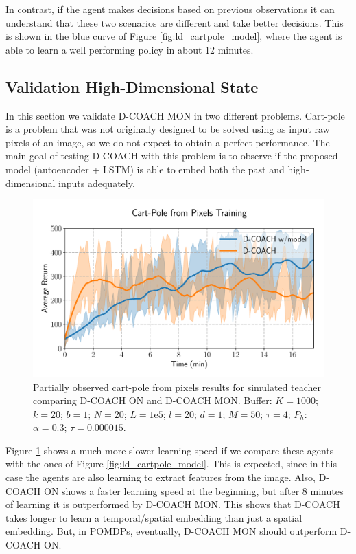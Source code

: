 In contrast, if the agent makes decisions based on previous observations it can understand that these two scenarios are different and take better decisions. This is shown in the blue curve of Figure \ref{fig:ld_cartpole_model}, where the agent is able to learn a well performing policy in about 12 minutes. 

\subsection{Validation High-Dimensional State}
In this section we validate D-COACH MON in two different problems. Cart-pole is a problem that was not originally designed to be solved using as input raw pixels of an image, so we do not expect to obtain a perfect performance. The main goal of testing D-COACH with this problem is to observe if the proposed model (autoencoder + LSTM) is able to embed both the past and high-dimensional inputs adequately.

\begin{figure}[h]
    \centering
    \includegraphics[width=0.9\linewidth]{imagenes/cap3/cartpole_HD_model.pdf}
    \caption{Partially observed cart-pole from pixels results for simulated teacher comparing D-COACH ON and D-COACH MON.  Buffer: $K = 1000$; $k=20$; $b = 1$; $N = 20$; $L=1\mathrm{e}5$; $l=20$; $d=1$; $M=50$; $\tau=4$; $P_{h}$: $\alpha = 0.3$; $\tau = 0.000015$.}
    \label{fig:cp_hd}
\end{figure}

Figure \ref{fig:cp_hd} shows a much more slower learning speed if we compare these agents with the ones of Figure \ref{fig:ld_cartpole_model}. This is expected, since in this case the agents are also learning to extract features from the image. Also, D-COACH ON shows a faster learning speed at the beginning, but after 8 minutes of learning it is outperformed by D-COACH MON. This shows that D-COACH takes longer to learn a temporal/spatial embedding than just a spatial embedding. But, in POMDPs, eventually, D-COACH MON should outperform D-COACH ON.

